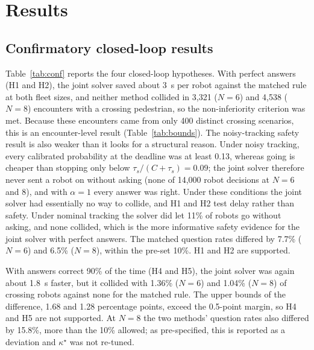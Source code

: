 \documentclass[a4paper,fleqn]{cas-dc}
\begin{document}
\section{Results}
\label{sec:results}

\subsection{Confirmatory closed-loop results}
\label{sec:res-conf}

Table~\ref{tab:conf} reports the four closed-loop hypotheses. With perfect answers (H1 and H2), the joint solver saved about \SI{3}{s} per robot against the matched rule at both fleet sizes, and neither method collided in 3{,}321 ($N = 6$) and 4{,}538 ($N = 8$) encounters with a crossing pedestrian, so the non-inferiority criterion was met. Because these encounters came from only 400 distinct crossing scenarios, this is an encounter-level result (Table~\ref{tab:bounds}). The noisy-tracking safety result is also weaker than it looks for a structural reason. Under noisy tracking, every calibrated probability at the deadline was at least 0.13, whereas going is cheaper than stopping only below $\tau_s/(C+\tau_s) = 0.09$; the joint solver therefore never sent a robot on without asking (none of 14{,}000 robot decisions at $N = 6$ and 8), and with $\alpha = 1$ every answer was right. Under these conditions the joint solver had essentially no way to collide, and H1 and H2 test delay rather than safety. Under nominal tracking the solver did let 11\% of robots go without asking, and none collided, which is the more informative safety evidence for the joint solver with perfect answers. The matched question rates differed by 7.7\% ($N = 6$) and 6.5\% ($N = 8$), within the pre-set 10\%. H1 and H2 are supported.

With answers correct 90\% of the time (H4 and H5), the joint solver was again about \SI{1.8}{s} faster, but it collided with 1.36\% ($N = 6$) and 1.04\% ($N = 8$) of crossing robots against none for the matched rule. The upper bounds of the difference, 1.68 and 1.28 percentage points, exceed the 0.5-point margin, so H4 and H5 are not supported. At $N = 8$ the two methods' question rates also differed by 15.8\%, more than the 10\% allowed; as pre-specified, this is reported as a deviation and $\kappa^\star$ was not re-tuned.
\end{document}
